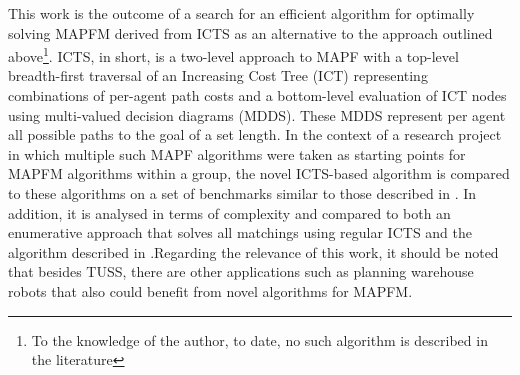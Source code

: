 \documentclass[english]{article}
\begin{document}
	This work is the outcome of a search for an efficient algorithm for optimally solving MAPFM derived from ICTS as an alternative to the approach outlined above\footnote{To the knowledge of the author, to date, no such algorithm is described in the literature}. ICTS, in short, is a two-level approach to MAPF with a top-level breadth-first traversal of an Increasing Cost Tree (ICT) representing combinations of per-agent path costs and a bottom-level evaluation of ICT nodes using multi-valued decision diagrams (MDDS). These MDDS represent per agent all possible paths to the goal of a set length. In the context of a research project in which multiple such 
	MAPF algorithms were taken as starting points for MAPFM algorithms within a group, the novel ICTS-based algorithm is compared to these algorithms on a set of benchmarks similar to those described in \cite{stern2019}. In addition, it is analysed in terms of complexity and compared to both an enumerative approach that solves all matchings using regular ICTS and the algorithm described in \cite{ma2016}.Regarding the relevance of this work, it should be noted that besides TUSS, there are other applications such as planning warehouse robots \cite{wurman2007} that also could benefit from novel algorithms for MAPFM.

\end{document}
